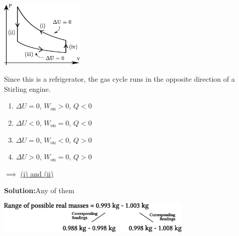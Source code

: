 \documentclass[11pt]{article}
\newcommand*\circled[1]{\tikz[baseline=(char.base)]{
		\node[shape=circle,draw,inner sep=2pt] (char) {#1};}}
\def\doubleunderline#1{\underline{\underline{#1}}}
\newcommand{\solution}[2]{\textbf{Solution:\hspace{1em}\circled{#1}}\hspace{1em}#2\hspace{1em}}
\newlength{\currentparskip}
\begin{document}
\begin{enumerate}[label={[Q\arabic*]},itemsep={1em}]
			\begin{minipage}[c]{4.5cm}
				\includegraphics[width=4cm]{49.eps}
			\end{minipage}%
			\setlength{\currentparskip}{\parskip}		%
			\begin{minipage}{\textwidth - 5.6cm}
				\setlength{\parskip}{\currentparskip}	%
				\noindent
				Since this is a refrigerator, the gas cycle runs in the opposite direction of a Stirling engine.
				\begin{enumerate}[label={(\roman*)}]
					\item $\Delta U = 0$, $W_\text{on} > 0$, $\boxed{Q<0}$
					\item $\Delta U < 0$, $W_\text{on} = 0$, $\boxed{Q<0}$
					\item $\Delta U = 0$, $W_\text{on} < 0$, $\boxed{Q>0}$
					\item $\Delta U > 0$, $W_\text{on} = 0$, $\boxed{Q>0}$
				\end{enumerate}
				$\implies$ \doubleunderline{(i) and (ii)}
			\end{minipage}
		\item \solution{E}{Any of them}
		\vspace{0.5em}
			\begin{center}
				\includegraphics[width=0.7\textwidth]{50.eps}
			\end{center}
	\end{enumerate}
\end{document}
